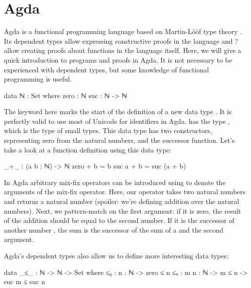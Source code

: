 \chapter{Agda}

	Agda is a functional programming language based on Martin-Lööf type theory
	\cite{?}. Its dependent types allow expressing constructive proofs in the
	language and ? allow creating proofs about functions in the language
	itself. Here, we will give a quick introduction to programs and proofs in
	Agda. It is not necessary to be experienced with dependent types, but some
	knowledge of functional programming is useful.
	
	\begin{code}
	
		data ℕ : Set where
		  zero : ℕ
		  suc : ℕ -> ℕ

	\end{code}

	The keyword  here marks the start of the definition of a new
	data type . It is perfectly valid to use most of Unicode for
	identifiers in Agda.  has the type , which is the
	type of small types. This data type has two constructors, 
	representing zero from the natural numbers, and  the successor
	function. Let's take a look at a function definition using this data type:
	
	\begin{code}

		_+_ : (a b : ℕ) -> ℕ
		zero + b = b
		suc a + b = suc (a + b)
	
	\end{code}
	
	In Agda arbitrary mix-fix operators can be introduced using \codett{\_} to
	denote the arguments of the mix-fix operator. Here, our operator
	\codett{\_+\_} takes two natural numbers and returns a natural number
	(spoiler: we're defining addition over the natural numbers). Next, we
	pattern-match on the first argument: if it is zero, the result of the
	addition should be equal to the second number. If it is the successor of
	another number , the sum is the successor of the sum of a and
	the second argument.

	Agda's dependent types also allow us to define more interesting data types:
	
	\begin{code}
		
		data _≤_ : ℕ -> ℕ -> Set where
		  ≤₀ : {n : ℕ} -> zero ≤ n
		  ≤ₛ : {m n : ℕ} -> m ≤ n -> suc m ≤ suc n

	\end{code}
	
